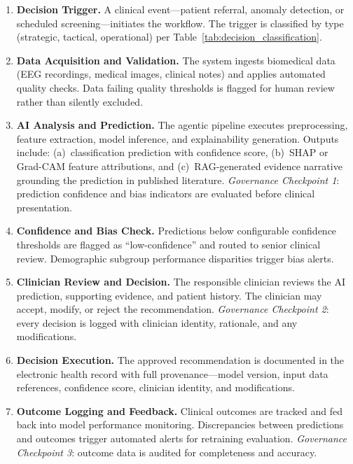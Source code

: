 \begin{enumerate}
    \item \textbf{Decision Trigger.} A clinical event---patient referral, anomaly detection, or scheduled screening---initiates the workflow. The trigger is classified by type (strategic, tactical, operational) per Table~\ref{tab:decision_classification}.

    \item \textbf{Data Acquisition and Validation.} The system ingests biomedical data (EEG recordings, medical images, clinical notes) and applies automated quality checks. Data failing quality thresholds is flagged for human review rather than silently excluded.

    \item \textbf{AI Analysis and Prediction.} The agentic pipeline executes preprocessing, feature extraction, model inference, and explainability generation. Outputs include: (a)~classification prediction with confidence score, (b)~SHAP or Grad-CAM feature attributions, and (c)~RAG-generated evidence narrative grounding the prediction in published literature. \textit{Governance Checkpoint 1}: prediction confidence and bias indicators are evaluated before clinical presentation.

    \item \textbf{Confidence and Bias Check.} Predictions below configurable confidence thresholds are flagged as ``low-confidence'' and routed to senior clinical review. Demographic subgroup performance disparities trigger bias alerts.

    \item \textbf{Clinician Review and Decision.} The responsible clinician reviews the AI prediction, supporting evidence, and patient history. The clinician may accept, modify, or reject the recommendation. \textit{Governance Checkpoint 2}: every decision is logged with clinician identity, rationale, and any modifications.

    \item \textbf{Decision Execution.} The approved recommendation is documented in the electronic health record with full provenance---model version, input data references, confidence score, clinician identity, and modifications.

    \item \textbf{Outcome Logging and Feedback.} Clinical outcomes are tracked and fed back into model performance monitoring. Discrepancies between predictions and outcomes trigger automated alerts for retraining evaluation. \textit{Governance Checkpoint 3}: outcome data is audited for completeness and accuracy.
\end{enumerate}

